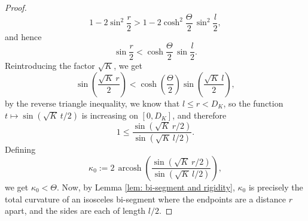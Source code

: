 \documentclass[hidelinks,12pt,a4paper]{article}
\numberwithin{equation}{section}
\theoremstyle{plain}
\theoremstyle{definition}
\DeclareMathOperator{\arcosh}{arcosh}
\newcommand{\fel}[1]{{\color{blue!50!purple} FR: #1}}
\begin{document}
\begin{proof}
\begin{equation*}
1-2\sin^2\frac{r}{2}
>
1-2\cosh^2\frac{\Theta}{2}\,\sin^2\frac{l}{2},
\end{equation*}
and hence
\begin{equation*}
\sin\frac{r}{2}<
\cosh\frac{\Theta}{2}\,\sin\frac{l}{2}.
\end{equation*}
Reintroducing the factor $\sqrt K$, we get
\begin{equation*}
\sin\left(\frac{\sqrt K\,r}{2}\right)<\cosh\left(\frac{\Theta}{2}\right)
\sin\left(\frac{\sqrt K\,l}{2}\right),
\end{equation*}
by the reverse triangle inequality, we know that $l\leq r<D_K$, so the function $t\mapsto \sin(\sqrt K\,t/2)$ is increasing on
$[0,D_K]$, and therefore
\begin{equation*}
1\leq\frac{\sin(\sqrt K\,r/2)}{\sin(\sqrt K\,l/2)}.
\end{equation*}
Defining
\begin{equation*}
\kappa_0:=2\,\arcosh\left(
\frac{\sin(\sqrt K\,r/2)}{\sin(\sqrt K\,l/2)}\right),
\end{equation*}
we get $\kappa_0< \Theta$. 
Now, by Lemma \ref{lem: bi-segment and rigidity}, $\kappa_0$ is precisely the total curvature of an isosceles bi-segment where the endpoints are a distance $r$ apart, and the sides are each of length $l/2$. \qedhere


\end{proof}



\end{document}
